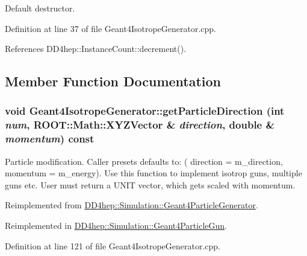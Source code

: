 Default destructor. 

Definition at line 37 of file Geant4IsotropeGenerator.cpp.

References DD4hep::InstanceCount::decrement().

\subsection{Member Function Documentation}
\hypertarget{class_d_d4hep_1_1_simulation_1_1_geant4_isotrope_generator_af4fcebcc7a5e4c13a458200d03b07f33}{
\subsubsection[{getParticleDirection}]{\setlength{\rightskip}{0pt plus 5cm}void Geant4IsotropeGenerator::getParticleDirection (int {\em num}, \/  ROOT::Math::XYZVector \& {\em direction}, \/  double \& {\em momentum}) const}}
\label{class_d_d4hep_1_1_simulation_1_1_geant4_isotrope_generator_af4fcebcc7a5e4c13a458200d03b07f33}


Particle modification. Caller presets defaults to: ( direction = m\_\-direction, momentum = m\_\-energy). Use this function to implement isotrop guns, multiple guns etc. User must return a UNIT vector, which gets scaled with momentum. 

Reimplemented from \hyperlink{class_d_d4hep_1_1_simulation_1_1_geant4_particle_generator_ac1bc512eb2de940c32c177a2c342d129}{DD4hep::Simulation::Geant4ParticleGenerator}.

Reimplemented in \hyperlink{class_d_d4hep_1_1_simulation_1_1_geant4_particle_gun_a38c98b33bbe2f7064bce8c9f4345f262}{DD4hep::Simulation::Geant4ParticleGun}.

Definition at line 121 of file Geant4IsotropeGenerator.cpp.

